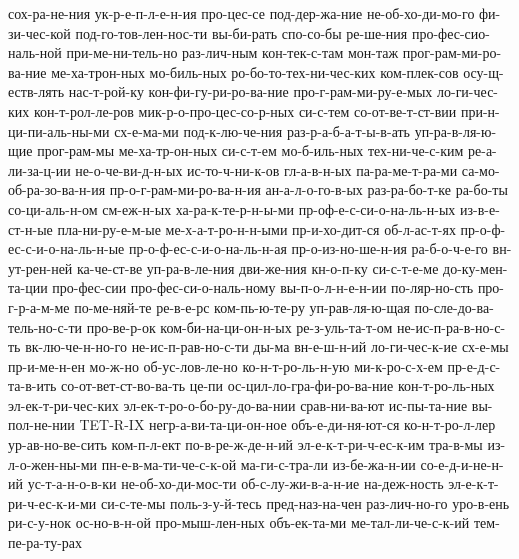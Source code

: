 {    сох-ра-не-ния
    ук-р-е-п-л-е-н-ия
    про-цес-се
    под-дер-жа-ние
    не-об-хо-ди-мо-го
    фи-зи-чес-кой
    под-го-тов-лен-нос-ти
    вы-би-рать
    спо-со-бы
    ре-ше-ния
    про-фес-сио-наль-ной
    при-ме-ни-тель-но
    раз-лич-ным
    кон-тек-с-там
    мон-таж
    прог-рам-ми-ро-ва-ние
    ме-ха-трон-ных
    мо-биль-ных
    ро-бо-то-тех-ни-чес-ких
    ком-плек-сов
    осу-щ-еств-лять
    нас-т-рой-ку
    кон-фи-гу-ри-ро-ва-ние
    про-г-рам-ми-ру-е-мых
    ло-ги-чес-ких
    кон-т-рол-ле-ров
    мик-р-о-про-цес-со-р-ных
    си-с-тем
    со-от-ве-т-ст-вии
    при-н-ци-пи-аль-ны-ми
    сх-е-ма-ми
    под-к-лю-че-ния
    раз-р-а-б-а-т-ы-в-ать
    уп-ра-в-ля-ю-щие
    прог-рам-мы
    ме-ха-тр-он-ных
    си-с-т-ем
    мо-б-иль-ных
    тех-ни-че-с-ким
    ре-а-ли-за-ц-ии
    не-о-че-ви-д-н-ых
    ис-то-ч-ни-к-ов
    гл-а-в-н-ых
    па-ра-ме-т-ра-ми
    са-мо-об-ра-зо-ва-н-ия
    пр-о-г-рам-ми-ро-ва-н-ия
    ан-а-л-о-го-в-ых
    раз-ра-бо-т-ке
    ра-бо-ты
    со-ци-аль-н-ом
    см-еж-н-ых
    ха-ра-к-те-р-н-ы-ми
    пр-оф-е-с-си-о-на-ль-н-ых
    из-в-е-ст-н-ые
    пла-ни-ру-е-м-ые
    ме-х-а-т-ро-н-н-ыми
    пр-и-хо-дит-ся
    об-л-ас-т-ях
    пр-о-ф-ес-с-и-о-на-ль-н-ые
    пр-о-ф-ес-с-и-о-на-ль-н-ая
    пр-о-из-но-ше-н-ия
    ра-б-о-ч-е-го
    вн-ут-рен-ней
    ка-че-ст-ве
    уп-ра-в-ле-ния
    дви-же-ния
    кн-о-п-ку
    си-с-т-е-ме
    до-ку-мен-та-ции
    про-фес-сии
    про-фес-си-о-наль-ному
    вы-п-о-л-н-е-н-ии
    по-ляр-но-сть
    про-г-р-а-м-ме
    по-ме-няй-те
    ре-в-е-рс
    ком-пь-ю-те-ру
    уп-рав-ля-ю-щая
    по-сле-до-ва-тель-но-с-ти
    про-ве-р-ок
    ком-би-на-ци-он-н-ых
    ре-з-уль-та-т-ом
    не-ис-п-ра-в-но-с-ть
    вк-лю-че-н-но-го
    не-ис-п-рав-но-с-ти
    ды-ма
    вн-е-ш-н-ий
    ло-ги-чес-к-ие
    сх-е-мы
    пр-и-ме-н-ен
    мо-ж-но
    об-ус-лов-ле-но
    ко-н-т-ро-ль-н-ую
    ми-к-ро-с-х-ем
    пр-е-д-с-та-в-ить
    со-от-вет-ст-во-ва-ть
    це-пи
    ос-цил-ло-гра-фи-ро-ва-ние
    кон-т-ро-ль-ных
    эл-ек-т-ри-чес-ких
    эл-ек-т-ро-о-бо-ру-до-ва-нии
    срав-ни-ва-ют
    ис-пы-та-ние
    вы-пол-не-нии
    TET-R-IX
    негр-а-ви-та-ци-он-ное
    объ-е-ди-ня-ют-ся
    ко-н-т-ро-л-лер
    ур-ав-но-ве-сить
    ком-п-л-ект
    по-в-ре-ж-де-н-ий
    эл-е-к-т-ри-ч-ес-к-им
    тра-в-мы
    из-л-о-жен-ны-ми
    пн-е-в-ма-ти-че-с-к-ой
    ма-ги-с-тра-ли
    из-бе-жа-н-ии
    со-е-д-и-не-н-ий
    ус-т-а-н-о-в-ки
    не-об-хо-ди-мос-ти
    об-с-лу-жи-в-а-н-ие
    на-деж-ность
    эл-е-к-т-ри-ч-ес-к-и-ми
    си-с-те-мы
    поль-з-у-й-тесь
    пред-наз-на-чен
    раз-лич-но-го
    уро-в-ень
    ри-с-у-нок
    ос-но-в-н-ой
    про-мыш-лен-ных
    объ-ек-та-ми
    ме-тал-ли-че-с-к-ий
    тем-пе-ра-ту-рах
    }